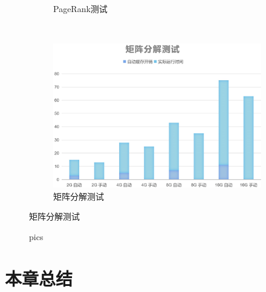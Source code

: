 \begin{figure}[!htbp]
\begin{subfigure}[b]{0.45\linewidth}
      \caption{PageRank测试}
      \label{fig:pagerank-auto-cache}
    \end{subfigure}%
    ~%
    \begin{subfigure}[b]{0.45\linewidth}
      \includegraphics[width=\textwidth]{Img/matrix-auto-cahe.jpg}
      \caption{矩阵分解测试}
      \label{fig:matrix-auto-cache}
    \end{subfigure}
    \label{fig:auto-cache}
\end{figure}


\begin{figure}[htbp]
\centering
{}
\quad
{}
\quad
{}
\quad
{}
\caption{ pics}
\end{figure}

\section{本章总结}


